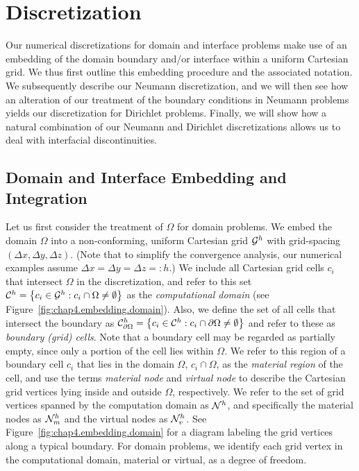 \section{Discretization} \label{sec:chap4.discretization}

Our numerical discretizations for domain and interface problems make use of an embedding of the domain boundary and/or interface within a uniform Cartesian grid. We thus first outline this embedding procedure and the associated notation. We subsequently describe our Neumann discretization, and we will then see how an alteration of our treatment of the boundary conditions in Neumann problems yields our discretization for Dirichlet problems. Finally, we will show how a natural combination of our Neumann and Dirichlet discretizations allows us to deal with interfacial discontinuities.

\subsection{Domain and Interface Embedding and Integration} \label{subsec:chap4.discretization.embedding}

Let us first consider the treatment of $\Omega$ for domain problems. We embed the domain $\Omega$ into a non-conforming, uniform Cartesian grid $\mathcal{G}^h$ with grid-spacing $(\Delta x, \Delta y, \Delta z)$. (Note that to simplify the convergence analysis, our numerical examples assume $\Delta x = \Delta y = \Delta z =: h$.) We include all Cartesian grid cells $c_i$ that intersect $\Omega$ in the discretization, and refer to this set $\mathcal{C}^h = \left\lbrace  c_i \in \mathcal{G}^h : c_i \cap \Omega \neq \emptyset  \right\rbrace$ as the \emph{computational domain} (see Figure~\ref{fig:chap4.embedding.domain}). Also, we define the set of all cells that intersect the boundary as $\mathcal{C}_{\partial\Omega}^h = \left\lbrace  c_i \in \mathcal{C}^h : c_i \cap \partial\Omega \neq \emptyset  \right\rbrace$ and refer to these as \emph{boundary (grid) cells}. Note that a boundary cell may be regarded as partially empty, since only a portion of the cell lies within $\Omega$. We refer to this region of a boundary cell $c_i$ that lies in the domain $\Omega$, $c_i \cap \Omega$, as the \emph{material region} of the cell, and use the terms \emph{material node} and \emph{virtual node} to describe the Cartesian grid vertices lying inside and outside $\Omega$, respectively. We refer to the set of grid vertices spanned by the computation domain as $\mathcal{N}^h$, and specifically the material nodes as $\mathcal{N}^h_m$ and the virtual nodes as $\mathcal{N}^h_v$. See Figure~\ref{fig:chap4.embedding.domain} for a diagram labeling the grid vertices along a typical boundary. For domain problems, we identify each grid vertex in the computational domain, material or virtual, as a degree of freedom.

